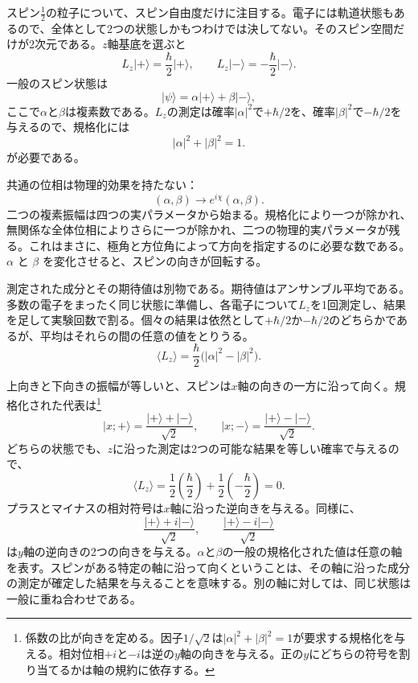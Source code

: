 スピン\(\tfrac12\)の粒子について、スピン自由度だけに注目する。電子には軌道状態もあるので、全体として2つの状態しかもつわけでは決してない。そのスピン空間だけが2次元である。\(z\)軸基底を選ぶと
\begin{equation}
L_z\lvert+\rangle=\frac{\hbar}{2}\lvert+\rangle,
\qquad
L_z\lvert-\rangle=-\frac{\hbar}{2}\lvert-\rangle.
\end{equation}
一般のスピン状態は
\begin{equation}
\lvert\psi\rangle
=
\alpha\lvert+\rangle+\beta\lvert-\rangle,
\end{equation}
ここで\(\alpha\)と\(\beta\)は複素数である。\(L_z\)の測定は確率\(|\alpha|^2\)で\(+\hbar/2\)を、確率\(|\beta|^2\)で\(-\hbar/2\)を与えるので、規格化には
\begin{equation}
|\alpha|^2+|\beta|^2=1.
\end{equation}
が必要である。

共通の位相は物理的効果を持たない：
\begin{equation}
(\alpha,\beta)\longrightarrow
e^{i\chi}(\alpha,\beta).
\end{equation}
二つの複素振幅は四つの実パラメータから始まる。規格化により一つが除かれ、無関係な全体位相によりさらに一つが除かれ、二つの物理的実パラメータが残る。これはまさに、極角と方位角によって方向を指定するのに必要な数である。\(\alpha\) と \(\beta\) を変化させると、スピンの向きが回転する。

測定された成分とその期待値は別物である。期待値はアンサンブル平均である。多数の電子をまったく同じ状態に準備し、各電子について\(L_z\)を1回測定し、結果を足して実験回数で割る。個々の結果は依然として\(+\hbar/2\)か\(-\hbar/2\)のどちらかであるが、平均はそれらの間の任意の値をとりうる。
\begin{equation}
\langle L_z\rangle
=
\frac{\hbar}{2}\bigl(|\alpha|^2-|\beta|^2\bigr).
\end{equation}

上向きと下向きの振幅が等しいと、スピンは\(x\)軸の向きの一方に沿って向く。規格化された代表は\footnote{係数の比が向きを定める。因子\(1/\sqrt2\)は\( |\alpha|^2+|\beta|^2=1\)が要求する規格化を与える。相対位相\(+i\)と\(-i\)は逆の\(y\)軸の向きを与える。正の\(y\)にどちらの符号を割り当てるかは軸の規約に依存する。}
\begin{equation}
\lvert x;+\rangle
=
\frac{\lvert+\rangle+\lvert-\rangle}{\sqrt2},
\qquad
\lvert x;-\rangle
=
\frac{\lvert+\rangle-\lvert-\rangle}{\sqrt2}.
\end{equation}
どちらの状態でも、\(z\)に沿った測定は2つの可能な結果を等しい確率で与えるので、
\begin{equation}
\langle L_z\rangle
=
\frac12\left(\frac{\hbar}{2}\right)
+
\frac12\left(-\frac{\hbar}{2}\right)
=0.
\end{equation}
プラスとマイナスの相対符号は\(x\)軸に沿った逆向きを与える。同様に、
\begin{equation}
\frac{\lvert+\rangle+i\lvert-\rangle}{\sqrt2},
\qquad
\frac{\lvert+\rangle-i\lvert-\rangle}{\sqrt2}
\end{equation}
は\(y\)軸の逆向きの2つの向きを与える。\(\alpha\)と\(\beta\)の一般の規格化された値は任意の軸を表す。スピンがある特定の軸に沿って向くということは、その軸に沿った成分の測定が確定した結果を与えることを意味する。別の軸に対しては、同じ状態は一般に重ね合わせである。

